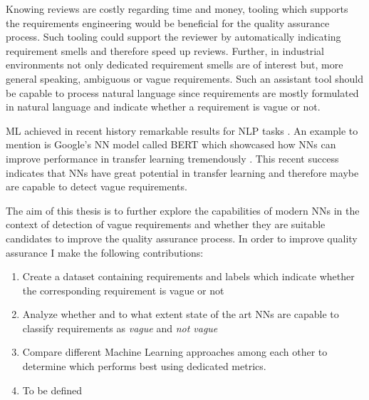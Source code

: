 Knowing reviews are costly regarding time and money, tooling which supports the requirements engineering would be beneficial for the quality assurance process.
Such tooling could support the reviewer by automatically indicating requirement smells and therefore speed up reviews.
Further, in industrial environments not only dedicated requirement smells are of interest but, more general speaking, ambiguous or vague requirements.
Such an assistant tool should be capable to process natural language since requirements are mostly formulated in natural language \parencite{Mich:2004} and indicate whether a requirement is vague or not.

\Ac{ML} achieved in recent history remarkable results for \ac{NLP} tasks \parencite{Khan:2016}.
An example to mention is Google's \ac{NN} model called BERT which showcased how \acp{NN} can improve performance in transfer learning tremendously \parencite{Devlin:2018}.
This recent success indicates that \acp{NN} have great potential in transfer learning and therefore maybe are capable to detect vague requirements.

The aim of this thesis is to further explore the capabilities of modern \acp{NN} in the context of detection of vague requirements and whether they are suitable candidates to improve the quality assurance process.
In order to improve quality assurance I make the following contributions:
\begin{enumerate}
    \item Create a dataset containing requirements and labels which indicate whether the corresponding requirement is vague or not
    \item Analyze whether and to what extent state of the art \acp{NN} are capable to classify requirements as \textit{vague} and \textit{not vague}
    \item Compare different Machine Learning approaches among each other to determine which performs best using dedicated metrics.
    \item To be defined
\end{enumerate}
